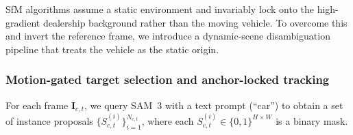 \documentclass[letterpaper, 10 pt, conference]{ieeeconf}  %
\begin{document}


SfM algorithms assume a static environment and invariably lock onto the high-gradient dealership background rather than the moving vehicle. To overcome this and invert the reference frame, we introduce a dynamic-scene disambiguation pipeline that treats the vehicle as the static origin.





\subsubsection{Motion-gated target selection and anchor-locked tracking}
For each frame $\mathbf{I}_{c,t}$, we query SAM~3 \cite{carion2025sam} with a text prompt (``car'') to obtain a set of instance proposals $\{S_{c,t}^{(i)}\}_{i=1}^{N_{c,t}}$, where each $S_{c,t}^{(i)}\in\{0,1\}^{H\times W}$ is a binary mask.
\end{document}
